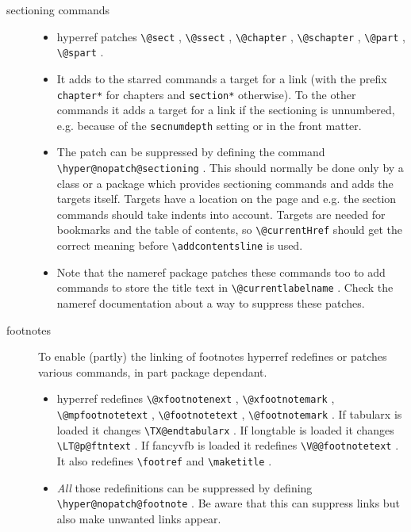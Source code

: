 \documentclass{article}
\newcommand*{\cs}[1]{%
  \texttt{\textbackslash #1}%
}
\newcommand*{\xpackage}[1]{\textsf{#1}}
\begin{document}
\begin{description}
\item[sectioning commands]
\begin{itemize}
\item \xpackage{hyperref} patches \cs{@sect}, \cs{@ssect}, \cs{@chapter}, \cs{@schapter},
\cs{@part}, \cs{@spart}.

\item It adds to the starred commands a target for a link (with the
prefix \texttt{chapter*} for chapters and \texttt{section*} otherwise).
To the other commands it adds a target for a link
if the sectioning is unnumbered, e.g. because of the \texttt{secnumdepth}
setting or in the front matter.

\item The patch can be suppressed by defining the command \cs{hyper@nopatch@sectioning}.
This should normally be done only by a class or a package
which provides sectioning commands and adds the targets itself.
Targets have a location on the page and e.g. the section commands should take indents into
account. Targets are needed for bookmarks and the table of contents,
so \cs{@currentHref} should get the correct meaning before
\cs{addcontentsline} is used.

\item Note that the \xpackage{nameref} package patches these commands too
to add commands to store the title text in \cs{@currentlabelname}.
Check the \xpackage{nameref} documentation about a way to suppress these patches.
\end{itemize}

\item[footnotes] To enable (partly) the linking of footnotes \xpackage{hyperref} redefines or patches various commands, in part package dependant.
\begin{itemize}
\item \xpackage{hyperref} redefines \cs{@xfootnotenext}, \cs{@xfootnotemark}, \cs{@mpfootnotetext},
    \cs{@footnotetext}, \cs{@footnotemark}.
    If \xpackage{tabularx} is loaded it changes \cs{TX@endtabularx}. If \xpackage{longtable} is loaded it changes \cs{LT@p@ftntext}.
    If \xpackage{fancyvfb} is loaded it redefines \cs{V@@footnotetext}. It also redefines \cs{footref} and \cs{maketitle}.

\item \emph{All} those redefinitions can be suppressed by defining \cs{hyper@nopatch@footnote}. Be aware that this can suppress links but also make unwanted links appear.
\end{itemize}


\end{description}
\end{document}
